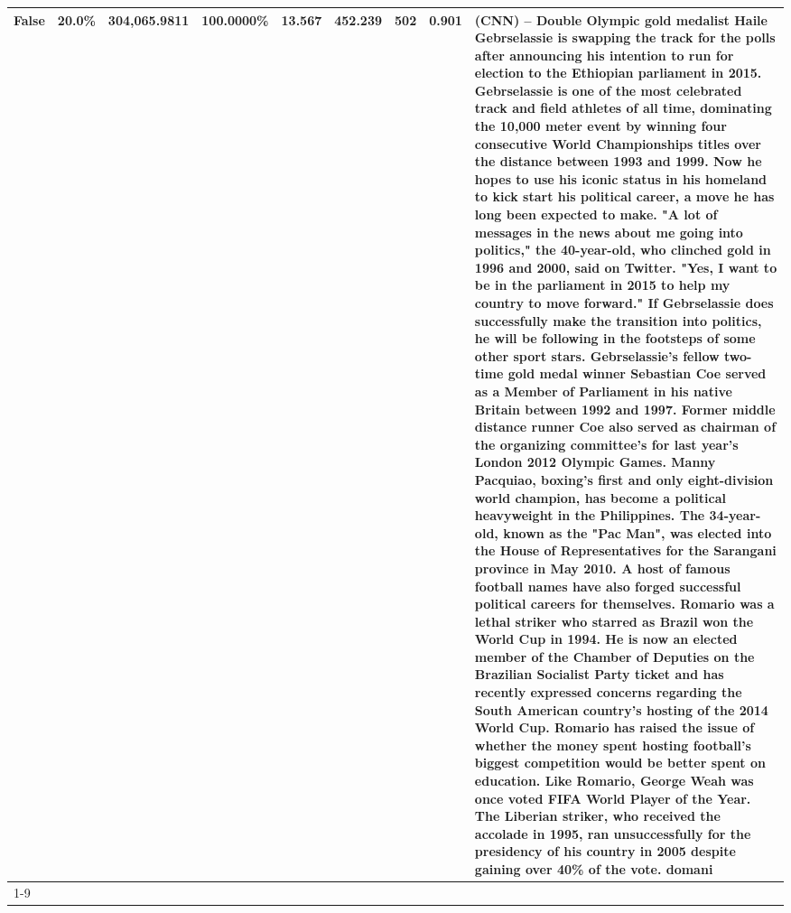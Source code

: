 \begin{table}[H]
{\begin{tabular}{lllrlllll}
False & 20.0\% & 304,065.9811 & \bfseries \color{red} 100.0000\% & 13.567 & 452.239 & 502 & 0.901 & (CNN) -- Double Olympic gold medalist Haile Gebrselassie is swapping the track for the polls after announcing his intention to run for election to the Ethiopian parliament in 2015. Gebrselassie is one of the most celebrated track and field athletes of all time, dominating the 10,000 meter event by winning four consecutive World Championships titles over the distance between 1993 and 1999. Now he hopes to use his iconic status in his homeland to kick start his political career, a move he has long been expected to make. "A lot of messages in the news about me going into politics," the 40-year-old, who clinched gold in 1996 and 2000, said on Twitter. "Yes, I want to be in the parliament in 2015 to help my country to move forward." If Gebrselassie does successfully make the transition into politics, he will be following in the footsteps of some other sport stars. Gebrselassie's fellow two-time gold medal winner Sebastian Coe served as a Member of Parliament in his native Britain between 1992 and 1997. Former middle distance runner Coe also served as chairman of the organizing committee's for last year's London 2012 Olympic Games. Manny Pacquiao, boxing's first and only eight-division world champion, has become a political heavyweight in the Philippines. The 34-year-old, known as the "Pac Man", was elected into the House of Representatives for the Sarangani province in May 2010. A host of famous football names have also forged successful political careers for themselves. Romario was a lethal striker who starred as Brazil won the World Cup in 1994. He is now an elected member of the Chamber of Deputies on the Brazilian Socialist Party ticket and has recently expressed concerns regarding the South American country's hosting of the 2014 World Cup. Romario has raised the issue of whether the money spent hosting football's biggest competition would be better spent on education. Like Romario, George Weah was once voted FIFA World Player of the Year. The Liberian striker, who received the accolade in 1995, ran unsuccessfully for the presidency of his country in 2005 despite gaining over 40\% of the vote. domani \\
\cline{1-9}

\end{tabular}}
\end{table}
